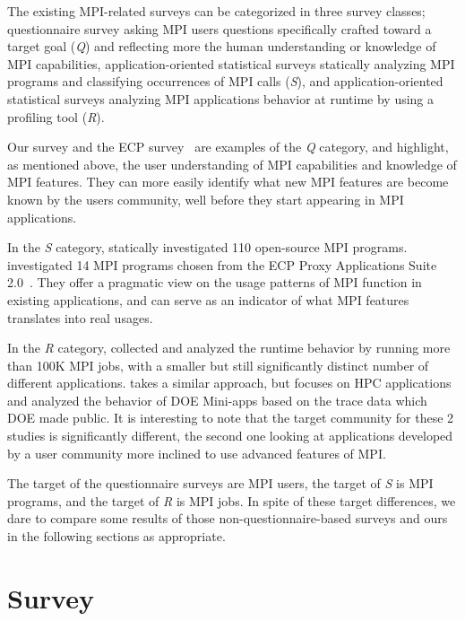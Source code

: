 \documentclass[preprint,5p,times]{elsarticle}
\begin{document}
The existing MPI-related surveys can be categorized in three survey classes;
%
questionnaire survey asking MPI users questions specifically crafted toward a
target goal ({\em Q}) and reflecting more the human understanding or knowledge of MPI capabilities,
%
application-oriented statistical surveys statically analyzing MPI programs and
classifying occurrences of MPI calls ({\em S}),
%
and application-oriented statistical surveys analyzing MPI applications behavior
at runtime by using a profiling tool ({\em R}).

Our survey and the ECP survey~\cite{ttps://doi.org/10.1002/cpe.4851} are examples of the {\em Q} category, and highlight, as mentioned above, the user understanding of MPI capabilities and knowledge of MPI features. They can more easily identify what new MPI features are become known by the users community, well before they start appearing in MPI applications.

In the {\em S} category, \cite{10.1145/3295500.3356176} statically investigated
110 open-source MPI programs. \cite{https://doi.org/10.1002/cpe.5901}
investigated 14 MPI programs chosen from the ECP Proxy Applications Suite
2.0~\cite{osti-1482870}. They offer a pragmatic view on the usage patterns of
MPI function in existing applications, and can serve as an indicator of what MPI
features translates into real usages.

In the {\em R} category, \cite{8665758} collected and
analyzed the runtime behavior by running more than 100K MPI
jobs, with a smaller but still significantly distinct number of different applications. \cite{10.1007/978-3-319-58667-0-12} takes a similar approach, but focuses on HPC applications and analyzed the behavior of DOE
Mini-apps based on the trace data which DOE made public. It is interesting to note that the target community for these 2 studies is significantly different, the second one looking at applications developed by a user community more inclined to use advanced features of MPI.

The target of the questionnaire surveys are MPI users, the target of
{\em S} is MPI programs, and the target of {\em R} is MPI jobs. In spite of
these target differences, we dare to compare some results of those
non-questionnaire-based surveys and ours in the
following sections as appropriate.

\section{Survey}
\end{document}
